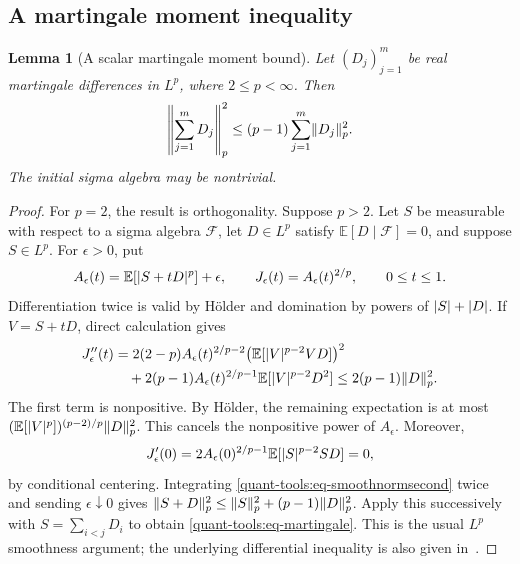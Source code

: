 \documentclass[11pt,reqno]{amsart}
\numberwithin{equation}{section}
\theoremstyle{plain}
\newtheorem{lemma}[lemma]{Lemma}
\theoremstyle{remark}
\DeclarePairedDelimiter{\abs}{\lvert}{\rvert}
\DeclarePairedDelimiter{\norm}{\lVert}{\rVert}
\newcommand{\E}{{\mathbb{E}}}
\begin{document}
\subsection{A martingale moment inequality}
\label{quant-tools:sec-moments}

\begin{lemma}[A scalar martingale moment bound]\label{quant-tools:lem-martingale}
Let $(D_j)_{j=1}^m$ be real martingale differences in $L^p$, where $2\leq p<\infty$. Then
\begin{equation}\label{quant-tools:eq-martingale}
 \left\|\sum_{j=1}^mD_j\right\|_p^2\leq(p-1)\sum_{j=1}^m\norm{D_j}_p^2.
\end{equation}
The initial sigma algebra may be nontrivial.
\end{lemma}
\begin{proof}
For $p=2$, the result is orthogonality. Suppose $p>2$. Let $S$ be measurable with respect to a sigma algebra $\mathcal F$, let $D\in L^p$ satisfy $\E[D\mid\mathcal F]=0$, and suppose $S\in L^p$. For $\epsilon>0$, put
\begin{equation}\label{quant-tools:eq-smoothnorm}
 A_\epsilon(t)=\E[\abs{S+tD}^p]+\epsilon,
 \qquad J_\epsilon(t)=A_\epsilon(t)^{2/p},\qquad 0\leq t\leq1.
\end{equation}
Differentiation twice is valid by H\"older and domination by powers of $\abs S+\abs D$. If $V=S+tD$, direct calculation gives
\begin{align}
 J_\epsilon''(t)
 &=2(2-p)A_\epsilon(t)^{2/p-2}
       \bigl(\E[\abs V^{p-2}VD]\bigr)^2\notag\\
 &\quad+2(p-1)A_\epsilon(t)^{2/p-1}
       \E[\abs V^{p-2}D^2]
 \leq2(p-1)\norm D_p^2.\label{quant-tools:eq-smoothnormsecond}
\end{align}
The first term is nonpositive. By H\"older, the remaining expectation is at most
$(\E[\abs V^p])^{(p-2)/p}\norm D_p^2$. This cancels the nonpositive power of $A_\epsilon$. Moreover,
\begin{equation}\label{quant-tools:eq-smoothnormfirst}
 J_\epsilon'(0)=2A_\epsilon(0)^{2/p-1}\E[\abs S^{p-2}SD]=0,
\end{equation}
by conditional centering. Integrating \eqref{quant-tools:eq-smoothnormsecond} twice and sending $\epsilon\downarrow0$ gives
$\norm{S+D}_p^2\leq\norm S_p^2+(p-1)\norm D_p^2$.
Apply this successively with $S=\sum_{i<j}D_i$ to obtain \eqref{quant-tools:eq-martingale}. This is the usual $L^p$ smoothness argument; the underlying differential inequality is also given in~\cite[Proposition 2.1]{Pinelis1994}.
\end{proof}
\end{document}
